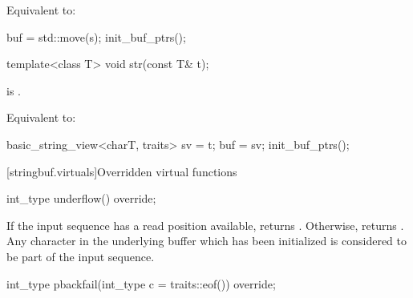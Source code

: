 \begin{itemdescr}
\pnum
\effects
Equivalent to:
\begin{codeblock}
buf = std::move(s);
init_buf_ptrs();
\end{codeblock}
\end{itemdescr}

%
\begin{itemdecl}
template<class T>
  void str(const T& t);
\end{itemdecl}

\begin{itemdescr}
\pnum
\constraints
{}
is .

\pnum
\effects
Equivalent to:
\begin{codeblock}
basic_string_view<charT, traits> sv = t;
buf = sv;
init_buf_ptrs();
\end{codeblock}
\end{itemdescr}

[stringbuf.virtuals]{Overridden virtual functions}

%
\begin{itemdecl}
int_type underflow() override;
\end{itemdecl}

\begin{itemdescr}
\pnum
\returns
If the input sequence has a read position available,
returns
.
Otherwise, returns
.
Any character in the underlying buffer which has been initialized is considered
to be part of the input sequence.
\end{itemdescr}

%
\begin{itemdecl}
int_type pbackfail(int_type c = traits::eof()) override;
\end{itemdecl}

